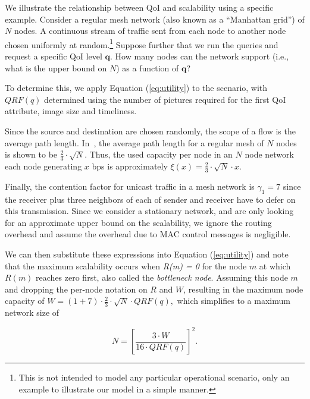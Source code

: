 We illustrate the relationship between QoI and scalability using a
 specific example.  Consider a
regular mesh network (also known as a ``Manhattan grid'') of $N$ nodes.
A continuous stream of traffic sent from each node to another node chosen
uniformly at random.\footnote{This is not
intended to model any particular operational scenario, only an
example to illustrate our model in a simple manner.}  Suppose
further that we run the queries and request a specific  QoI level $\mathbf{q}$.  How
many nodes can the network support (i.e., what is the upper bound on
$N$) as a function of $\mathbf{q}$?

To determine this, we apply Equation (\ref{eq:utility}) to the scenario, with
$QRF(q)$  determined using the number of pictures required for the first QoI attribute, image size and timeliness.

Since the source and destination are chosen randomly, the scope of a flow is
the average path length. In~\cite{Silv83}, the average path length for a
regular mesh of $N$ nodes is shown to be
$\frac{2}{3}\cdot \sqrt{N}$. Thus, the used capacity per node
in an $N$ node network each node generating $x$ bps
is approximately $\xi(x) = \frac{2}{3}\cdot \sqrt{N}\cdot
x$.

Finally, the contention factor for unicast traffic in a mesh network
is $\gamma_1 = 7$ since the receiver
plus three neighbors of each of sender and receiver
 have to defer on this transmission. Since we
consider a stationary network, and are only looking for an approximate
upper bound on the scalability, we ignore the routing overhead and
assume the overhead due to MAC control messages is negligible.



We can then substitute these expressions  into Equation (\ref{eq:utility}) and note that the maximum
scalability occurs when \emph{R(m) = 0} for the node $m$ at which $R(m)$ reaches zero first, also called the \emph{bottleneck node}.  Assuming this node $m$ and dropping the per-node notation on $R$ and $W$, resulting in the maximum node capacity of
$
W = (1+7)\cdot \frac{2}{3}\cdot  \sqrt{N}\cdot  QRF(q),  
$
which simplifies to a maximum network size of

\begin{equation}
N = [\frac{3\cdot W}{16\cdot QRF(q)}]^2.
\end{equation}

